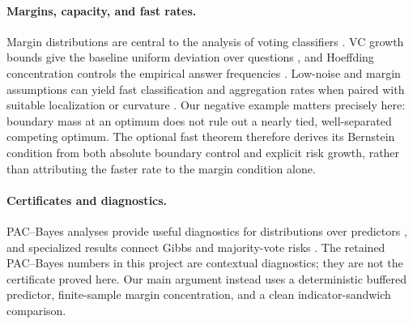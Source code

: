 \paragraph{Margins, capacity, and fast rates.}
Margin distributions are central to the analysis of voting classifiers
\citep{schapire1997boostingtm,koltchinskii2001furthereo}.  VC growth bounds give
the baseline uniform deviation over questions
\citep{vapnik1971uniform,blumer1989learnability}, and Hoeffding concentration
controls the empirical answer frequencies \citep{hoeffding1963probability}.
Low-noise and margin assumptions can yield fast classification and aggregation
rates when paired with suitable localization or curvature
\citep{mammen1999smooth,tsybakov2004optimal,massart2006risk,
bartlett2005local,koltchinskii2006local,audibert2005fastlr}.  Our negative
example matters precisely here: boundary mass at an optimum does not rule out
a nearly tied, well-separated competing optimum.  The optional fast theorem
therefore derives its Bernstein condition from both absolute boundary control
and explicit risk growth, rather than attributing the faster rate to the margin
condition alone.

\paragraph{Certificates and diagnostics.}
PAC--Bayes analyses provide useful diagnostics for distributions over
predictors \citep{mcallester1999pacbayes,dziugaite2017computing}, and specialized
results connect Gibbs and majority-vote risks
\citep{viallard2021selfboundingmv,wu2021chebyshevcantellipi}.  The retained
PAC--Bayes numbers in this project are contextual diagnostics; they are not the
certificate proved here.  Our main argument instead uses a deterministic
buffered predictor, finite-sample margin concentration, and a clean
indicator-sandwich comparison.
